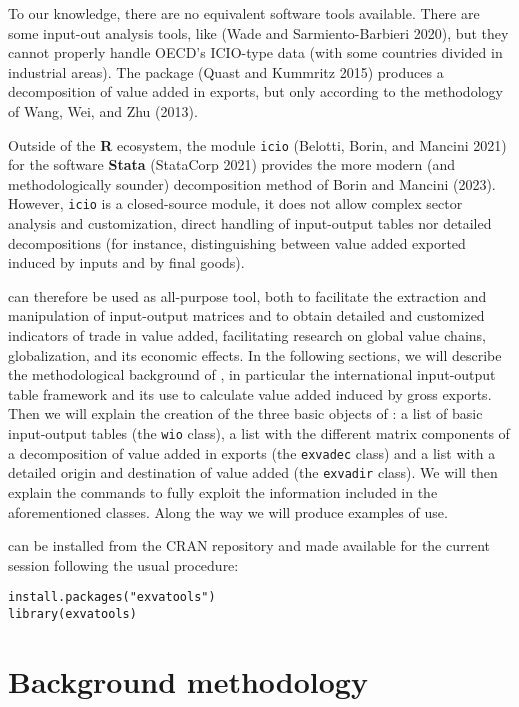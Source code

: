 To our knowledge, there are no equivalent software tools available. There are
some input-out analysis tools, like 
(Wade and Sarmiento-Barbieri 2020), but they cannot properly handle OECD's ICIO-type data
(with some countries divided in industrial areas). The package 
(Quast and Kummritz 2015) produces a decomposition of value added in exports, but
only according to the methodology of Wang, Wei, and Zhu (2013).

Outside of the \textbf{R} ecosystem, the module \texttt{icio} (Belotti, Borin, and Mancini 2021) for the
software \textbf{Stata} (StataCorp 2021) provides the more modern (and
methodologically sounder) decomposition method of Borin and Mancini (2023).
However, \texttt{icio} is a closed-source module, it does not allow complex sector
analysis and customization, direct handling of input-output tables nor detailed
decompositions (for instance, distinguishing between value added exported
induced by inputs and by final goods).

 can therefore be used as all-purpose tool, both to
facilitate the extraction and manipulation of input-output matrices and to
obtain detailed and customized indicators of trade in value added, facilitating
research on global value chains, globalization, and its economic effects. In the
following sections, we will describe the methodological background of
, in particular the international input-output table
framework and its use to calculate value added induced by gross exports. Then we
will explain the creation of the three basic objects of : a
list of basic input-output tables (the \texttt{wio} class), a list with the different
matrix components of a decomposition of value added in exports (the \texttt{exvadec}
class) and a list with a detailed origin and destination of value added (the
\texttt{exvadir} class). We will then explain the commands to fully exploit the
information included in the aforementioned classes. Along the way we will
produce examples of use.

 can be installed from the CRAN repository and made
available for the current session following the usual procedure:

\begin{verbatim}
install.packages("exvatools")
library(exvatools)
\end{verbatim}

\hypertarget{background-methodology}{%
\section{Background methodology}\label{background-methodology}}

